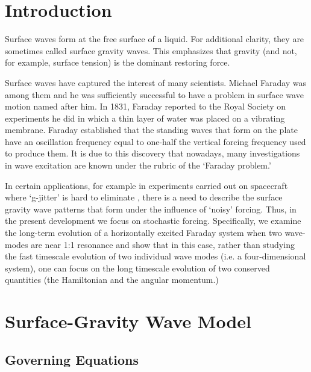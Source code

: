 \section{Introduction}

Surface waves form at the free surface of a liquid. For additional clarity, they are sometimes called surface gravity waves. This emphasizes that gravity (and not, for example, surface tension) is the dominant restoring force.

Surface waves have captured the interest of many scientists. Michael Faraday was among them and he was sufficiently successful to have a problem in surface wave motion named after him. In 1831, Faraday reported to the Royal Society \citep{faraday31:_acous_figur} on experiments he did in which a thin layer of water was placed on a vibrating membrane. Faraday established that the standing waves that form on the plate have an oscillation frequency equal to one-half the vertical forcing frequency used to produce them. It is due to this discovery that nowadays, many investigations in wave excitation are known under the rubric of the `Faraday problem.'


In certain applications, for example in experiments carried out on spacecraft where `g-jitter' is hard to eliminate \citep{walter87:_fluid}, there is a need to describe the surface gravity wave patterns that form under the influence of `noisy' forcing. Thus, in the present development we focus on stochastic forcing. Specifically, we examine the long-term evolution of a horizontally excited Faraday system when two wave-modes are near 1:1 resonance and show that in this case, rather than studying the fast timescale evolution of two individual wave modes (i.e. a four-dimensional system), one can focus on the long timescale evolution of two conserved quantities (the Hamiltonian and the angular momentum.)

\section{Surface-Gravity Wave Model}
\subsection{Governing Equations}
\label{s:governing equations}

